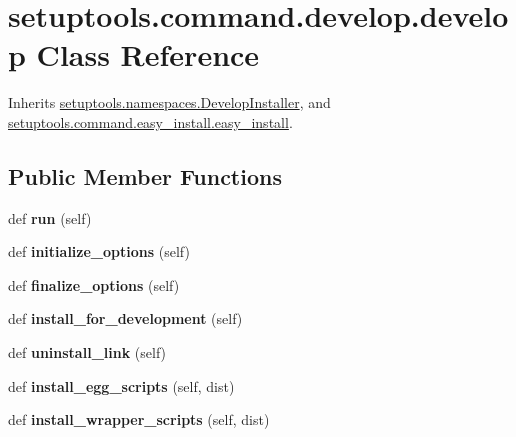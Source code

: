 \hypertarget{classsetuptools_1_1command_1_1develop_1_1develop}{}\section{setuptools.\+command.\+develop.\+develop Class Reference}
\label{classsetuptools_1_1command_1_1develop_1_1develop}


Inherits \hyperlink{classsetuptools_1_1namespaces_1_1_develop_installer}{setuptools.\+namespaces.\+Develop\+Installer}, and \hyperlink{classsetuptools_1_1command_1_1easy__install_1_1easy__install}{setuptools.\+command.\+easy\+\_\+install.\+easy\+\_\+install}.

\subsection*{Public Member Functions}
\begin{DoxyCompactItemize}
\item 
\mbox{\label{classsetuptools_1_1command_1_1develop_1_1develop_abe6f068b17364267fdb2ad80ebd2ead9}} 
def {\bfseries run} (self)
\item 
\mbox{\label{classsetuptools_1_1command_1_1develop_1_1develop_a68852e42237fb4b147f8883ff11003ed}} 
def {\bfseries initialize\+\_\+options} (self)
\item 
\mbox{\label{classsetuptools_1_1command_1_1develop_1_1develop_a869394627f223b3cd23f08a8abcac0b3}} 
def {\bfseries finalize\+\_\+options} (self)
\item 
\mbox{\label{classsetuptools_1_1command_1_1develop_1_1develop_a0334bc03494f1c1b9361789a1f080b36}} 
def {\bfseries install\+\_\+for\+\_\+development} (self)
\item 
\mbox{\label{classsetuptools_1_1command_1_1develop_1_1develop_ac37121318ed4fdec25d3ea3e5574035a}} 
def {\bfseries uninstall\+\_\+link} (self)
\item 
\mbox{\label{classsetuptools_1_1command_1_1develop_1_1develop_abfc03a01676df9150420f8573f159604}} 
def {\bfseries install\+\_\+egg\+\_\+scripts} (self, dist)
\item 
\mbox{\label{classsetuptools_1_1command_1_1develop_1_1develop_a5553fb3c32f948489fa06b23012b07c9}} 
def {\bfseries install\+\_\+wrapper\+\_\+scripts} (self, dist)
\end{DoxyCompactItemize}
